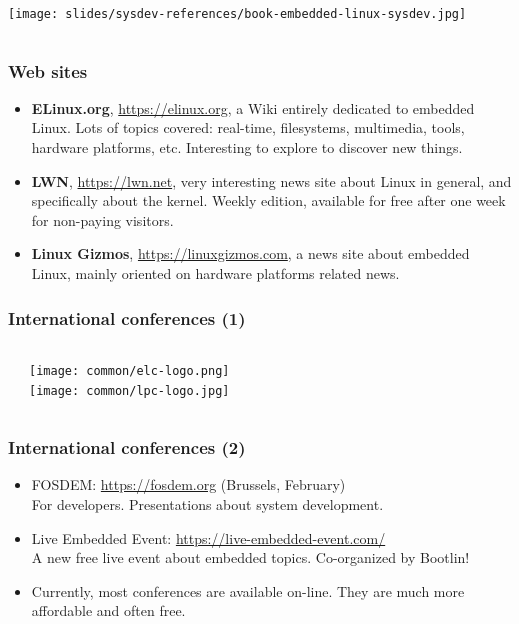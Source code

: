 \begin{frame}
\begin{columns}
    \vspace{0.5cm}
    \texttt{[image: slides/sysdev-references/book-embedded-linux-sysdev.jpg]}\\
  \end{columns}
\end{frame}

\begin{frame}
  \frametitle{Web sites}
  \begin{itemize}
  \item {\bf ELinux.org}, \url{https://elinux.org}, a Wiki entirely
    dedicated to embedded Linux. Lots of topics covered: real-time,
    filesystems, multimedia, tools, hardware platforms,
    etc. Interesting to explore to discover new things.
  \item {\bf LWN}, \url{https://lwn.net}, very interesting news site
    about Linux in general, and specifically about the kernel. Weekly
    edition, available for free after one week for non-paying
    visitors.
  \item {\bf Linux Gizmos}, \url{https://linuxgizmos.com}, a news site
    about embedded Linux, mainly oriented on hardware platforms
    related news.
  \end{itemize}
\end{frame}

\begin{frame}
  \frametitle{International conferences (1)}
  \begin{columns}
    \begin{itemize}
    
    
    \end{itemize}
     \texttt{[image: common/elc-logo.png]}\\
     \vspace{1cm}
     \texttt{[image: common/lpc-logo.jpg]}\\
  \end{columns}
\end{frame}

\begin{frame}
  \frametitle{International conferences (2)}
  \begin{itemize}
  \item FOSDEM: \url{https://fosdem.org} (Brussels, February)\\
    For developers. Presentations about system development.
  \item Live Embedded Event: \url{https://live-embedded-event.com/}\\
	A new free live event about embedded topics. Co-organized by
        Bootlin!
  \item Currently, most conferences are available on-line. They
        are much more affordable and often free.
  \end{itemize}
\end{frame}
